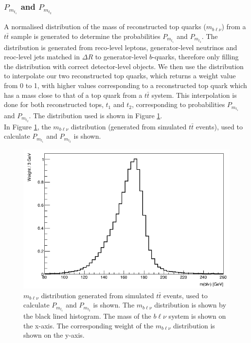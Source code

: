 \subsubsection{$P_{m_{t_{1}}}$ and $P_{m_{t_{2}}}$}
A normalised distribution of the mass of reconstructed top quarks ($m_{b\ell\nu}$) from a $t\bar{t}$ sample is generated to determine the probabilities $P_{m_{t_{1}}}$ and $P_{m_{t_{2}}}$. The distribution is generated from reco-level leptons, generator-level neutrinos and reoc-level jets matched in $\Delta R$ to generator-level $b$-quarks, therefore only filling the distribution with correct detector-level objects. We then use the distribution to interpolate our two reconstructed top quarks, which returns a weight value from 0 to 1, with higher values corresponding to a reconstructed top quark which has a mass close to that of a top quark from a $t\bar{t}$ system. This interpolation is done for both reconstructed tops, $t_{1}$ and $t_{2}$, corresponding to probabilities $P_{m_{t_{1}}}$ and $P_{m_{t_{2}}}$. The distribution used is shown in Figure \ref{fig:2vSM-mass-dist}.\\

In Figure \ref{fig:2vSM-mass-dist}, the $m_{b\ell\nu}$ distribution (generated from simulated $t\bar{t}$ events), used to calculate $P_{m_{t_{1}}}$ and $P_{m_{t_{2}}}$ is shown.

\begin{figure}[h!]
	\includegraphics[width=0.45\linewidth]{figures/mtop_2vSM.png}
	\centering
	\caption{$m_{b\ell\nu}$ distribution generated from simulated $t\bar{t}$ events, used to calculate $P_{m_{t_{1}}}$ and $P_{m_{t_{2}}}$ is shown. The $m_{b\ell\nu}$ distribution is shown by the black lined histogram. The mass of the $b\ell\nu$ system is shown on the x-axis. The corresponding weight of the $m_{b\ell\nu}$ distribution is shown on the y-axis.}
	\label{fig:2vSM-mass-dist}
\end{figure}
